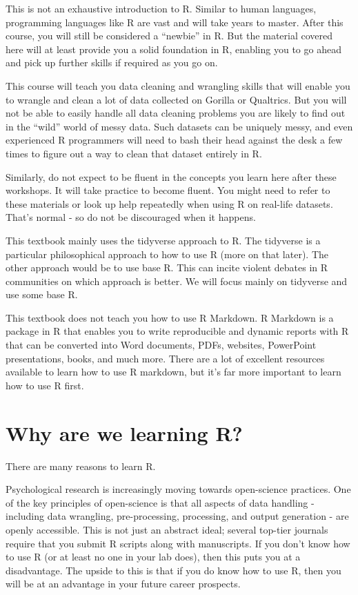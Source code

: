 \documentclass[
]{book}
\begin{document}
This is not an exhaustive introduction to R.
Similar to human languages, programming languages like R are vast and will take years to master.
After this course, you will still be considered a ``newbie'' in R.
But the material covered here will at least provide you a solid foundation in R, enabling you to go ahead and pick up further skills if required as you go on.

This course will teach you data cleaning and wrangling skills that will enable you to wrangle and clean a lot of data collected on Gorilla or Qualtrics.
But you will not be able to easily handle all data cleaning problems you are likely to find out in the ``wild'' world of messy data.
Such datasets can be uniquely messy, and even experienced R programmers will need to bash their head against the desk a few times to figure out a way to clean that dataset entirely in R.

Similarly, do not expect to be fluent in the concepts you learn here after these workshops.
It will take practice to become fluent.
You might need to refer to these materials or look up help repeatedly when using R on real-life datasets.
That's normal - so do not be discouraged when it happens.

This textbook mainly uses the tidyverse approach to R.
The tidyverse is a particular philosophical approach to how to use R (more on that later).
The other approach would be to use base R.
This can incite violent debates in R communities on which approach is better.
We will focus mainly on tidyverse and use some base R.

This textbook does not teach you how to use R Markdown.
R Markdown is a package in R that enables you to write reproducible and dynamic reports with R that can be converted into Word documents, PDFs, websites, PowerPoint presentations, books, and much more.
There are a lot of excellent resources available to learn how to use R markdown, but it's far more important to learn how to use R first.

\section{Why are we learning R?}\label{why-are-we-learning-r}

There are many reasons to learn R.

Psychological research is increasingly moving towards open-science practices.
One of the key principles of open-science is that all aspects of data handling - including data wrangling, pre-processing, processing, and output generation - are openly accessible.
This is not just an abstract ideal; several top-tier journals require that you submit R scripts along with manuscripts.
If you don't know how to use R (or at least no one in your lab does), then this puts you at a disadvantage.
The upside to this is that if you do know how to use R, then you will be at an advantage in your future career prospects.
\end{document}
